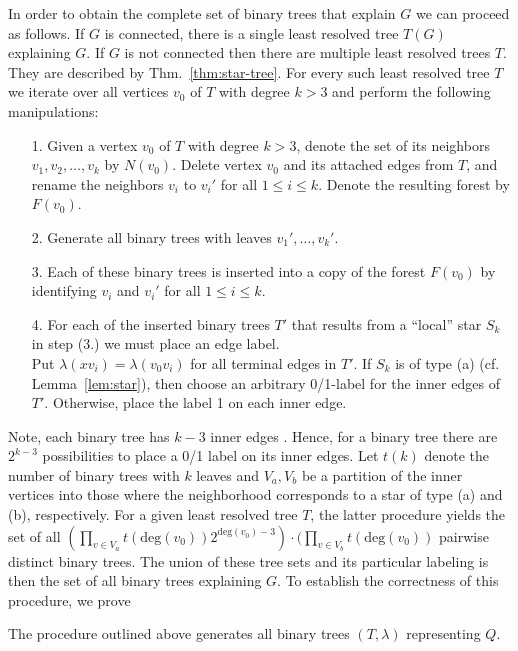 \documentclass[smallextended]{svjour3}
\let\cite\citep
\newcommand{\rev}[1]{\begingroup\color{blue}#1\endgroup}
\begin{document}
In order to obtain the complete set of binary trees that explain $G$ we can
proceed as follows. If $G$ is connected, there is a single least resolved
tree $T(G)$ explaining $G$. If $G$ is not connected then there are multiple
least resolved trees $T$. They are described by
Thm.~\ref{thm:star-tree}. For every such least resolved tree $T$ we iterate
over all vertices $v_0$ of $T$ with degree $k>3$ and perform the following
manipulations:
\begin{itemize}
\item[{1.}] Given a vertex $v_0$ of $T$ with degree $k>3$, denote the set of 
	its  neighbors $v_1, v_2,\dots, v_k$  by $N(v_0)$. 
	Delete vertex $v_0$ and its attached
  edges from $T$, and rename the neighbors $v_i$ to $v_i'$ for all $1\leq
  i\leq k$. Denote the resulting forest by $F(v_0)$.
\item[{2.}] Generate all binary trees with leaves $v_1',\dots, v_k'$. 
\item[{3.}] Each of these binary trees is inserted into a copy of the
  forest $F(v_0)$ by \rev{identifying} $v_i$ and $v_i'$ for all $1\leq
  i\leq k$.
\item[{4.}] \rev{
  For each of the inserted binary trees $T'$ that results 
  from a ``local'' star $S_k$ in step (3.) we must place an edge label. \\
  Put $\lambda(xv_i)= \lambda(v_0v_i)$ for all terminal edges in $T'$.
  If $S_k$ is of type  (a)  (cf.\, Lemma~\ref{lem:star}),  
 then choose an arbitrary 0/1-label  for the inner edges of $T'$.
 Otherwise, place the label 1 on each   inner edge. }
\end{itemize}
\rev{Note, each binary tree has $k-3$ inner edges \cite{sem-ste-03a}. 
Hence, for a binary tree there are $2^{k-3}$ possibilities to place
a 0/1 label on its inner edges. 
Let $t(k)$ denote the number of binary trees with $k$ leaves
and $V_a,V_b$ be a partition of the inner vertices into those
where the neighborhood corresponds to a star of type  (a) and (b), 
respectively. 
For a given least resolved tree $T$, the latter procedure
yields the set of all
$ (\prod_{v\in V_a} t(\mathrm{deg}(v_0))2^{\mathrm{deg}(v_0)-3} ) \cdot  (\prod_{v\in V_b} t(\mathrm{deg}(v_0) ) $
pairwise distinct binary trees. The union of
these tree sets and its particular labeling is then the set of all binary trees explaining $G$.  }
To establish the correctness of this procedure, we prove
\newline
\begin{lemma}\label{lem:binary}
  The procedure outlined above generates all binary trees $(T,\lambda)$
  representing $Q$.
\end{lemma}
\end{document}
